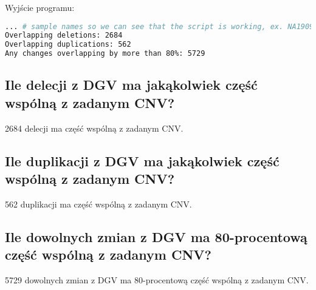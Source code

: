 \documentclass{article}
\begin{document}
Wyjście programu:
\begin{lstlisting}[language=bash]
... # sample names so we can see that the script is working, ex. NA19099
Overlapping deletions: 2684
Overlapping duplications: 562
Any changes overlapping by more than 80%: 5729
\end{lstlisting}
\subsection{Ile delecji z DGV ma jakąkolwiek część wspólną z zadanym CNV?}
2684 delecji ma część wspólną z zadanym CNV.
\subsection{Ile duplikacji z DGV ma jakąkolwiek część wspólną z zadanym CNV?}
562 duplikacji ma część wspólną z zadanym CNV.
\subsection{Ile dowolnych zmian z DGV ma 80-procentową część wspólną z zadanym CNV?}
5729 dowolnych zmian z DGV ma 80-procentową część wspólną z zadanym CNV.
\end{document}
